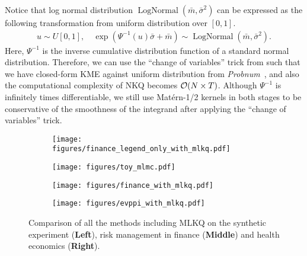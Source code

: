 Notice that log normal distribution $\operatorname{LogNormal}(\bar{m}, \bar{\sigma}^2) $ can be expressed as the following transformation from uniform distribution over $[0,1]$. 
\begin{align*}
    u \sim U[0,1], \quad \exp(\Psi^{-1}(u)\bar{\sigma} + \bar{m}) \sim \operatorname{LogNormal}(\bar{m}, \bar{\sigma}^2) .
\end{align*}
Here, $\Psi^{-1}$ is the inverse cumulative distribution function of a standard normal distribution.
Therefore, we can use the ``change of variables'' trick from  such that we have closed-form KME against uniform distribution from \textit{Probnum}~\cite{Wenger2021}, and also the computational complexity of NKQ becomes $\mathcal{O}(N \times T)$. 
Although $\Psi^{-1}$ is infinitely times differentiable, we still use Mat\'{e}rn-1/2 kernels in both stages to be conservative of the smoothness of the integrand after applying the ``change of variables'' trick.

\begin{figure*}[t]
    \centering
    \begin{minipage}{\textwidth}
    \begin{subfigure}[b]{1.0\linewidth}
        \centering
        \texttt{[image: figures/finance\_legend\_only\_with\_mlkq.pdf]}
    \end{subfigure}
    \vspace{-17pt}
    \end{minipage}
    
    \begin{subfigure}[b]{0.32\linewidth}
        \centering
        \texttt{[image: figures/toy\_mlmc.pdf]}
    \end{subfigure}
    \hfill
    \begin{subfigure}[b]{0.32\linewidth}
        \centering
        \texttt{[image: figures/finance\_with\_mlkq.pdf]}
    \end{subfigure}
    \hfill
    \begin{subfigure}[b]{0.32\linewidth}
        \centering
        \texttt{[image: figures/evppi\_with\_mlkq.pdf]}
    \end{subfigure}
    \vspace{-10pt}
    \caption{Comparison of all the methods including MLKQ on the synthetic experiment (\textbf{Left}), risk management in finance (\textbf{Middle}) and health economics (\textbf{Right}). }
    \label{fig:combined_all}
    \vspace{-10pt}
\end{figure*}

